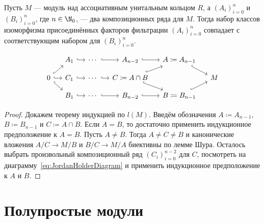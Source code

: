 \documentclass[
	extrafontsizes,
	11pt,
	hyphens,
]{memoir}
\begin{document}
\begin{theorem}
Пусть \(M\) --- модуль над ассоциативным унитальным кольцом \(R\),
а \((A_i)_{i=0}^n\) и \((B_i)_{i=0}^n\), где \(n \in \N_0\), --- два композиционных ряда для \(M\).
Тогда набор классов изоморфизма присоединённых факторов
фильтрации \((A_i)_{i=0}^n\) совпадает с соответствующим набором для \((B_i)_{i=0}^n\).
\end{theorem}

\begin{equation}%
\label{eq:JordanHolderDiagram}
\begin{tikzcd}[sep = small,]
 & A_1 \ar[hookrightarrow]{r} & \cdots{} \ar[hookrightarrow]{r} & A_{n-2} \ar[hookrightarrow]{r} & A \coloneqq A_{n-1} \ar[hookrightarrow]{dr} & \\
0 \ar[hookrightarrow]{ur} \ar[hookrightarrow]{dr} \ar[hookrightarrow]{r} & C_1 \ar[hookrightarrow]{r} & \cdots{} \ar[hookrightarrow]{r} & C \coloneqq A \cap B \ar[hookrightarrow]{ur} \ar[hookrightarrow]{dr} & & M \\
 & B_1 \ar[hookrightarrow]{r} & \cdots{} \ar[hookrightarrow]{r} & B_{n-2} \ar[hookrightarrow]{r} & B \coloneqq B_{n-1} \ar[hookrightarrow]{ur} & 
\end{tikzcd}
\end{equation}

\begin{proof}
Докажем теорему индукцией по \(l(M)\).
Введём обозначения \(A \coloneqq A_{n-1}\), \(B \coloneqq B_{n-1}\) и \(C \coloneqq A \cap B\).
Если \(A = B\), то достаточно применить индукционное предположение к \(A = B\).
Пусть \(A \neq B\).
Тогда \(A \neq C \neq B\) и канонические вложения \(A/C \to M/B\) и \(B/C \to M/A\) биективны по лемме Шура.
Осталось выбрать произвольный композиционный ряд \((C_i)_{i=0}^{n-2}\) для \(C\), посмотреть на диаграмму~\eqref{eq:JordanHolderDiagram} и применить индукционное предположение к \(A\) и \(B\).
\end{proof}


\section{Полупростые модули}
\end{document}
